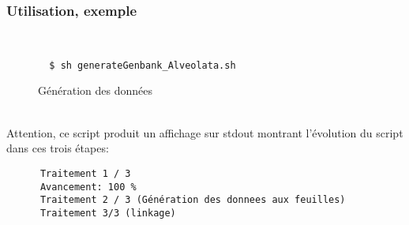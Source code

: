 \subsubsection{Utilisation, exemple}

~\\
\begin{figure}[H]
\begin{center}
\begin{verbatim}
  $ sh generateGenbank_Alveolata.sh 
  \end{verbatim}
\end{center}
\caption{Génération des données}
\end{figure}
~\\


Attention, ce script produit un affichage sur stdout montrant l'évolution du script dans ces trois étapes:

\begin{verbatim}
      Traitement 1 / 3
      Avancement: 100 %
      Traitement 2 / 3 (Génération des donnees aux feuilles)
      Traitement 3/3 (linkage)
\end{verbatim}



